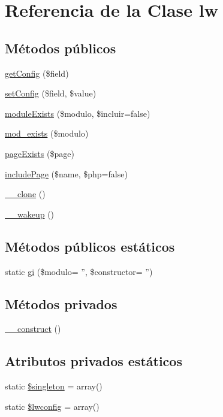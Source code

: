 \hypertarget{classlw}{\section{Referencia de la Clase lw}
\label{classlw}
}
\subsection*{Métodos públicos}
\begin{DoxyCompactItemize}
\item 
\hyperlink{classlw_af394a71fca91e024e566871383d33e2c}{get\-Config} (\$field)
\item 
\hyperlink{classlw_a7351419af27f87d315f7e3f2d8174c5d}{set\-Config} (\$field, \$value)
\item 
\hyperlink{classlw_abcf9b188696b4d63cb90218064e076c3}{module\-Exists} (\$modulo, \$incluir=false)
\item 
\hyperlink{classlw_aba61508ddf1137390531f5df811276a4}{mod\-\_\-exists} (\$modulo)
\item 
\hyperlink{classlw_a373d0d56d75bed4f27708430d94c1895}{page\-Exists} (\$page)
\item 
\hyperlink{classlw_a09a4cc34f2223b9f0c58d7b0e9362a3e}{include\-Page} (\$name, \$php=false)
\item 
\hyperlink{classlw_ad0cb87b388bc74d63dc884accdca8713}{\-\_\-\-\_\-clone} ()
\item 
\hyperlink{classlw_a19dd44fe063cfd1cbafe97452e57666c}{\-\_\-\-\_\-wakeup} ()
\end{DoxyCompactItemize}
\subsection*{Métodos públicos estáticos}
\begin{DoxyCompactItemize}
\item 
static \hyperlink{classlw_a2a82141a13e0594d6ebd540801a927b7}{gi} (\$modulo= '', \$constructor= '')
\end{DoxyCompactItemize}
\subsection*{Métodos privados}
\begin{DoxyCompactItemize}
\item 
\hyperlink{classlw_a095c5d389db211932136b53f25f39685}{\-\_\-\-\_\-construct} ()
\end{DoxyCompactItemize}
\subsection*{Atributos privados estáticos}
\begin{DoxyCompactItemize}
\item 
static \hyperlink{classlw_ad7c29f111cfe9bc40757426bcb40d907}{\$singleton} = array()
\item 
static \hyperlink{classlw_aa3f18fbc8cb885a0e5471a6630ec72aa}{\$lwconfig} = array()
\end{DoxyCompactItemize}


